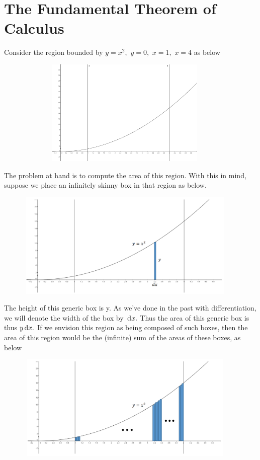 \chapter{The Fundamental Theorem of Calculus }
  \label{chapt:FTC}
\aptta{}
\endaptta{}
Consider the region bounded by $y=x^2,$ $y=0,$ $x=1,$ $x=4$ as below\\
\centerline{\includegraphics*[height=2in,width=5in]{Figures/FTC-1}}
The problem at hand is to compute the area of this region.  With this
in mind, suppose we place an infinitely skinny box in that region as
below.\\ 
\centerline{\includegraphics*[height=2in,width=5in]{Figures/FTC-2}}
The height of this generic box is y.  As we’ve done in the past with
differentiation, we will denote the width of the box by $\thinspace{\rm d}x.$  Thus the
area of this generic box is thus $y\thinspace{\rm d}x.$  If we envision this region as
being composed of such boxes, then the area of this region would be
the (infinite) sum of the areas of these boxes, as below\\
\centerline{\includegraphics*[height=2in,width=5in]{Figures/FTC-3}}

